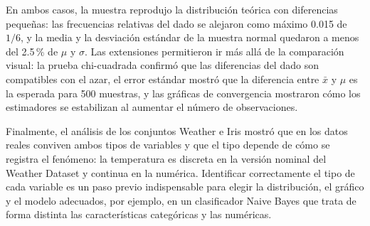 \documentclass[11pt,letterpaper]{article}
\begin{document}
En ambos casos, la muestra reprodujo la distribución teórica con diferencias pequeñas: las frecuencias relativas del dado se alejaron como máximo 0.015 de $1/6$, y la media y la desviación estándar de la muestra normal quedaron a menos del 2.5\,\% de $\mu$ y $\sigma$. Las extensiones permitieron ir más allá de la comparación visual: la prueba chi-cuadrada confirmó que las diferencias del dado son compatibles con el azar, el error estándar mostró que la diferencia entre $\bar{x}$ y $\mu$ es la esperada para 500 muestras, y las gráficas de convergencia mostraron cómo los estimadores se estabilizan al aumentar el número de observaciones.

Finalmente, el análisis de los conjuntos Weather e Iris mostró que en los datos reales conviven ambos tipos de variables y que el tipo depende de cómo se registra el fenómeno: la temperatura es discreta en la versión nominal del Weather Dataset y continua en la numérica. Identificar correctamente el tipo de cada variable es un paso previo indispensable para elegir la distribución, el gráfico y el modelo adecuados, por ejemplo, en un clasificador Naive Bayes que trata de forma distinta las características categóricas y las numéricas.

\end{document}
